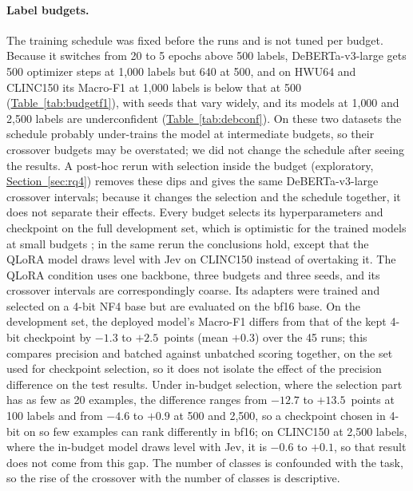 \paragraph{Label budgets.}
The training schedule was fixed before the runs and is not tuned per budget. Because it switches from 20 to 5 epochs
above 500 labels, DeBERTa-v3-large gets 500 optimizer steps at 1{,}000 labels but 640 at 500, and on HWU64 and CLINC150
its Macro-F1 at 1{,}000 labels is below that at 500 (\hyperref[tab:budgetf1]{Table~\ref*{tab:budgetf1}}), with seeds
that vary widely, and its models at 1{,}000 and 2{,}500 labels are underconfident
(\hyperref[tab:debconf]{Table~\ref*{tab:debconf}}). On these two datasets the schedule probably under-trains the model at
intermediate budgets, so their crossover budgets may be overstated; we did not change the schedule after seeing the
results. A post-hoc rerun with selection inside the budget (exploratory, \hyperref[sec:rq4]{Section~\ref*{sec:rq4}})
removes these dips and gives the same DeBERTa-v3-large crossover intervals; because it changes the selection and the
schedule together, it does not separate their effects. Every budget selects its hyperparameters
and checkpoint on the full development set, which is optimistic for the trained models at small budgets
\citep{perez2021true}; in the same rerun the conclusions hold, except that the QLoRA model draws level with Jev on
CLINC150 instead of overtaking it. The QLoRA condition uses one backbone, three budgets and three
seeds, and its crossover intervals are correspondingly coarse. Its adapters were trained and selected on a 4-bit NF4 base
but are evaluated on the bf16 base. On the development set, the deployed model's Macro-F1 differs from that of the kept
4-bit checkpoint by $-1.3$ to $+2.5$~points (mean $+0.3$) over the 45 runs; this compares precision and batched against
unbatched scoring together, on the set used for checkpoint selection, so it does not isolate the effect of the precision
difference on the test results. Under in-budget selection, where the selection part has as few as 20 examples, the
difference ranges from $-12.7$ to $+13.5$~points at 100 labels and from $-4.6$ to $+0.9$ at 500 and 2{,}500, so a
checkpoint chosen in 4-bit on so few examples can rank differently in bf16; on CLINC150 at 2{,}500 labels, where the
in-budget model draws level with Jev, it is $-0.6$ to $+0.1$, so that result does not come from this gap. The number of classes is confounded with the task, so the
rise of the crossover with the number of classes is descriptive.

